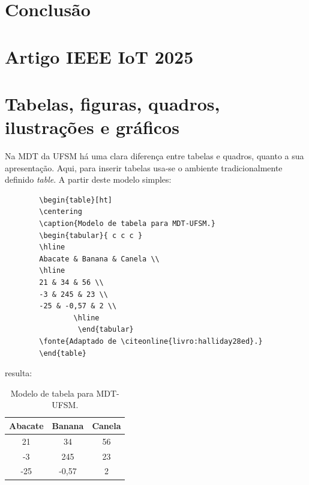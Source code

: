 \documentclass[oneside,openright,12pt]{ufsm_2021} %
\begin{document}
\chapter{Conclusão}
\label{cap:Conclusao}
\apendice %
\chapter{Artigo IEEE IoT 2025}
\label{cap:Artigo}
    
        
            
        
\chapter{Tabelas, figuras, quadros, ilustrações e gráficos}
         
         \par Na MDT da UFSM há uma clara diferença entre tabelas e quadros, quanto a sua apresentação. Aqui, para inserir tabelas usa-se o ambiente tradicionalmente definido \textit{table}. A partir deste modelo simples:
        
         \begin{verbatim}
		\begin{table}[ht]
		\centering
		\caption{Modelo de tabela para MDT-UFSM.}
		\begin{tabular}{ c c c }
		\hline
		Abacate & Banana & Canela \\
		\hline
		21 & 34 & 56 \\
		-3 & 245 & 23 \\
		-25 & -0,57 & 2 \\
                \hline
                 \end{tabular}
		\fonte{Adaptado de \citeonline{livro:halliday28ed}.}
		\end{table}
	  \end{verbatim}
         
         \noindent resulta:
         
         \begin{table}[ht]
         \centering
         \caption{Modelo de tabela para MDT-UFSM.}
         \begin{tabular}{ c c c }
         \hline
         Abacate & Banana & Canela \\
         \hline
         21 & 34 & 56 \\
         -3 & 245 & 23 \\
         -25 & -0,57 & 2 \\
         \hline
         \end{tabular}
         \end{table}
         
\end{document}

